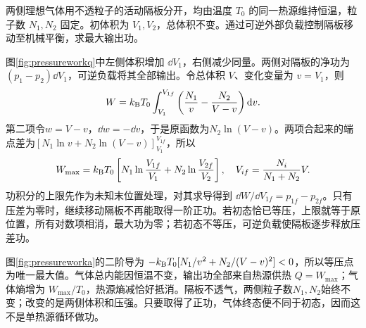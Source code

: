 \begin{example}[等温压强不均匀气体的最大功]
两侧理想气体用不透粒子的活动隔板分开，均由温度 $T_0$ 的同一热源维持恒温，粒子数 $N_1,N_2$ 固定。初体积为 $V_1,V_2$，总体积不变。通过可逆外部负载控制隔板移动至机械平衡，求最大输出功。
\end{example}
\begin{solution}
图\ref{fig:pressureworkq}中左侧体积增加 $\dd V_1$，右侧减少同量。两侧对隔板的净功为 $(p_1-p_2)\dd V_1$，可逆负载将其全部输出。令总体积 $V$、变化变量为 $v=V_1$，则
\[
 W=k_{\mathrm B} T_0\int_{V_1}^{V_{1f}}
 \left(\frac{N_1}v-\frac{N_2}{V-v}\right)\mathop{}\!\mathrm d v.
\]
第二项令$w=V-v$，$\dd w=-\dd v$，于是原函数为$N_2\ln(V-v)$。两项合起来的端点差为$[N_1\ln v+N_2\ln(V-v)]_{V_1}^{V_{1f}}$，所以
\[
 W_{\max}=k_{\mathrm B} T_0\left[N_1\ln\frac{V_{1f}}{V_1}
 +N_2\ln\frac{V_{2f}}{V_2}\right],
 \quad V_{if}=\frac{N_i}{N_1+N_2}V.
\]
功积分的上限先作为未知末位置处理，对其求导得到 $\dd W/\dd V_{1f}=p_{1f}-p_{2f}$。只有压差为零时，继续移动隔板不再能取得一阶正功。若初态恰已等压，上限就等于原位置，所有对数项相消，最大功为零；若初态不等压，可逆负载使隔板逐步释放压差功。

图\ref{fig:pressureworka}的二阶导为 $-k_{\mathrm B} T_0[N_1/v^2+N_2/(V-v)^2]<0$，所以等压点为唯一最大值。气体总内能因恒温不变，输出功全部来自热源供热 $Q=W_{\max}$；气体熵增为 $W_{\max}/T_0$，热源熵减恰好抵消。隔板不透气，两侧粒子数$N_1,N_2$始终不变；改变的是两侧体积和压强。只要取得了正功，气体终态便不同于初态，因而这不是单热源循环做功。
\end{solution}

